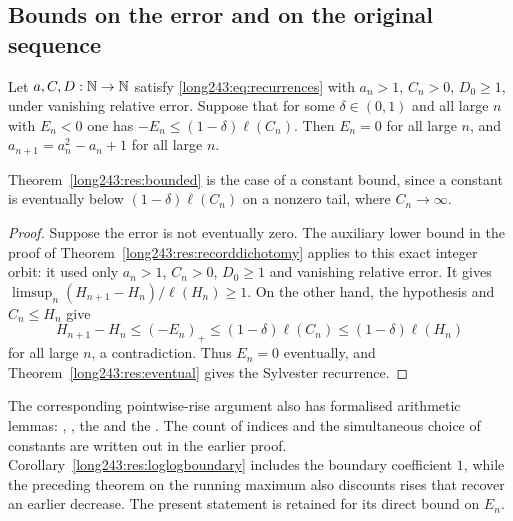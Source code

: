 \documentclass[11pt]{article}
\begin{document}
\subsection{Bounds on the error and on the original sequence}

\begin{theorem}\label{long243:res:slownegative}
Let $a,C,D:\mathbb{N}\to\mathbb{N}$ satisfy \eqref{long243:eq:recurrences} with $a_n>1$, $C_n>0$, $D_0\ge1$, under
vanishing relative error.  Suppose that for some $\delta\in(0,1)$ and all large $n$
with $E_n<0$ one has $-E_n\le(1-\delta)\ell(C_n)$.  Then $E_n=0$ for all large
$n$, and $a_{n+1}=a_n^2-a_n+1$ for all large $n$.
\end{theorem}

\noindent Theorem~\ref{long243:res:bounded} is the case of a constant bound, since a
constant is eventually below $(1-\delta)\ell(C_n)$ on a nonzero tail,
where $C_n\to\infty$.

\begin{proof}
Suppose the error is not eventually zero. The auxiliary lower bound in
the proof of Theorem~\ref{long243:res:recorddichotomy} applies to this
exact integer orbit: it used only $a_n>1$, $C_n>0$, $D_0\ge1$ and
vanishing relative error. It gives
$\limsup_n(H_{n+1}-H_n)/\ell(H_n)\ge1$.
On the other hand, the hypothesis and $C_n\le H_n$ give
\[
 H_{n+1}-H_n\le(-E_n)_+
 \le(1-\delta)\ell(C_n)\le(1-\delta)\ell(H_n)
\]
for all large $n$, a contradiction. Thus $E_n=0$ eventually, and
Theorem~\ref{long243:res:eventual} gives the Sylvester recurrence.
\end{proof}

The corresponding pointwise-rise argument also has formalised arithmetic
lemmas:
,
, the
 and
the
.  The count of indices and the simultaneous choice of constants are
written out in the earlier proof. Corollary~\ref{long243:res:loglogboundary} includes the
boundary coefficient $1$, while the preceding theorem on the running
maximum also discounts rises that recover an earlier decrease. The present
statement is retained for its direct bound on $E_n$.
\end{document}
